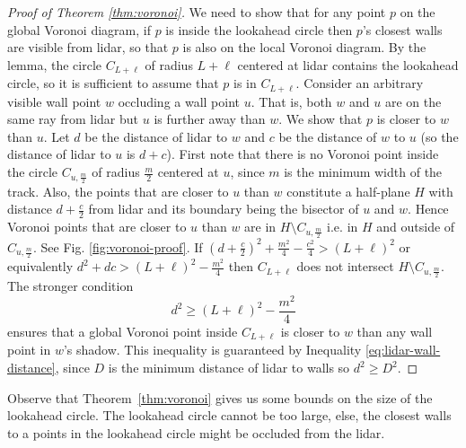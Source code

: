\begin{proof}[Proof of Theorem \ref{thm:voronoi}]
We need to show that for any point $p$ on the global Voronoi diagram, if $p$ is inside the lookahead circle then $p$'s closest walls are visible from lidar, so that $p$ is also on the local Voronoi diagram.
%
By the lemma, the circle $C_{L+\ell}$ of radius $L+\ell$ centered at lidar contains the lookahead circle, so it is sufficient to assume that $p$ is in $C_{L+\ell}$.
Consider an arbitrary visible wall point $w$ occluding a wall point $u$.
That is, both $w$ and $u$ are on the same ray from lidar but $u$ is further away than $w$.
We show that $p$ is closer to $w$ than $u$.
Let $d$ be the distance of lidar to $w$ and $c$ be the distance of $w$ to $u$ (so the distance of lidar to $u$ is $d+c$).
First note that there is no Voronoi point inside the circle $C_{u, \frac{m}{2}}$ of radius $\frac{m}{2}$ centered at $u$, since $m$ is the minimum width of the track.
Also, the points that are closer to $u$ than $w$ constitute a half-plane $H$ with distance $d+\frac{c}{2}$ from lidar and its boundary being the bisector of $u$ and $w$.
Hence Voronoi points that are closer to $u$ than $w$ are in $H\setminus C_{u, \frac{m}{2}}$ i.e. in $H$ and outside of $C_{u, \frac{m}{2}}$.
See Fig. \ref{fig:voronoi-proof}.
If
$(d+\frac{c}{2})^2 + \frac{m^2}{4} - \frac{c^2}{4} > (L+\ell)^2$
or equivalently
$ d^2+dc > (L+\ell)^2-\frac{m^2}{4} $
then $C_{L+\ell}$ does not intersect $H\setminus C_{u, \frac{m}{2}}$.
The stronger condition 
\begin{equation}
     d^2 \geq (L+\ell)^2-\frac{m^2}{4}
\end{equation}
ensures that a global Voronoi point inside $C_{L+\ell}$ is closer to $w$ than any wall point in $w$'s shadow.
This inequality is guaranteed by Inequality \ref{eq:lidar-wall-distance}, since $D$ is the minimum distance of lidar to walls so $d^2 \geq D^2$.
\end{proof}

Observe that Theorem~\ref{thm:voronoi} gives us some bounds on the size of the lookahead circle. 
%
The lookahead circle cannot be too large, else, the closest walls to a points in the lookahead circle might be occluded from the lidar.


